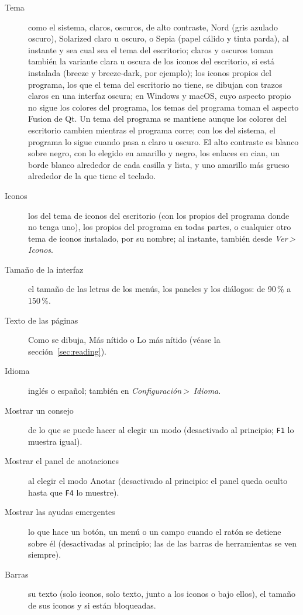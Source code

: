 \documentclass[12pt,
              article,
              oneside
              ]{memoir}
\newcommand*{\menu}[1]{\textit{#1}}
\newcommand*{\then}{\,>\,}
\newcommand*{\key}[1]{\texttt{#1}}
\begin{document}
%
\begin{description}
\item[Tema] como el sistema, claros, oscuros, de alto contraste, Nord (gris azulado oscuro), Solarized claro u oscuro, o Sepia (papel cálido y tinta parda), al instante y sea cual sea el tema del escritorio; claros y oscuros toman también la variante clara u oscura de los iconos del escritorio, si está instalada (breeze y breeze-dark, por ejemplo); los iconos propios del programa, los que el tema del escritorio no tiene, se dibujan con trazos claros en una interfaz oscura; en Windows y macOS, cuyo aspecto propio no sigue los colores del programa, los temas del programa toman el aspecto Fusion de Qt. Un tema del programa se mantiene aunque los colores del escritorio cambien mientras el programa corre; con los del sistema, el programa lo sigue cuando pasa a claro u oscuro. El alto contraste es blanco sobre negro, con lo elegido en amarillo y negro, los enlaces en cian, un borde blanco alrededor de cada casilla y lista, y uno amarillo más grueso alrededor de la que tiene el teclado.
\item[Iconos] los del tema de iconos del escritorio (con los propios del programa donde no tenga uno), los propios del programa en todas partes, o cualquier otro tema de iconos instalado, por su nombre; al instante, también desde \menu{Ver\then Iconos}.
\item[Tamaño de la interfaz] el tamaño de las letras de los menús, los
  paneles y los diálogos: de 90\,\% a 150\,\%.
\item[Texto de las páginas] Como se dibuja, Más nítido o Lo más nítido
  (véase la sección~\ref{sec:reading}).
\item[Idioma] inglés o español; también en \menu{Configuración\then
  Idioma}.
\item[Mostrar un consejo] de lo que se puede hacer al elegir un modo
  (desactivado al principio; \key{F1} lo muestra igual).
\item[Mostrar el panel de anotaciones] al elegir el modo Anotar
  (desactivado al principio: el panel queda oculto hasta que \key{F4} lo
  muestre).
\item[Mostrar las ayudas emergentes] lo que hace un botón, un menú o un
  campo cuando el ratón se detiene sobre él (desactivadas al principio;
  las de las barras de herramientas se ven siempre).
\item[Barras] su texto (solo iconos, solo texto, junto a los iconos o bajo
  ellos), el tamaño de sus iconos y si están bloqueadas.
\end{description}
\end{document}
